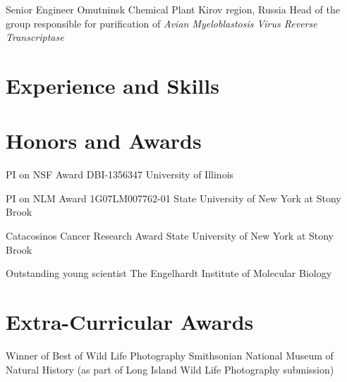 \documentclass[11pt,letterpaper,sans]{moderncv} %
\begin{document}
{Senior Engineer}
{Omutninsk Chemical Plant}
{Kirov region, Russia}
{}
{Head of the group responsible for purification of
  \itshape Avian Myeloblastosis Virus Reverse Transcriptase}


\section{Experience and Skills}


\newpage
\section{Honors and Awards}

{PI on NSF Award DBI-1356347}
{University of Illinois}

{PI on NLM Award 1G07LM007762-01}
{State University of New York at Stony Brook}

{Catacosinos Cancer Research Award}
{State University of New York at Stony Brook}

{Outstanding young scientist}
{The Engelhardt Institute of Molecular Biology}

\section{Extra-Curricular Awards}

{Winner of Best of Wild Life Photography}
{Smithsonian National Museum of Natural History (as part of Long Island Wild Life Photography submission)}
\end{document}
